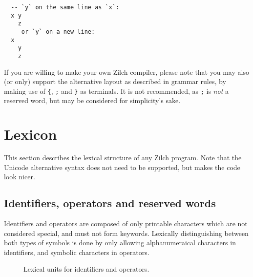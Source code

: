 \noindent\begin{verbatim}
  -- `y` on the same line as `x`:
  x y
    z
  -- or `y` on a new line:
  x
    y
    z
\end{verbatim}
\vspace*{\baselineskip}

If you are willing to make your own Zilch compiler, please note that you may also (or only) support the alternative layout as described in grammar rules, by making use of \verb|{|, \verb|;| and \verb|}| as terminals.
It is not recommended, as \verb|;| is \textit{not} a reserved word, but may be considered for simplicity's sake.

\section{Lexicon}\label{sec:zilch-grammar-lexical}

This section describes the lexical structure of any Zilch program.
Note that the Unicode alternative syntax does not need to be supported, but makes the code look nicer.

\subsection{Identifiers, operators and reserved words}\label{subsec:zilch-grammar-lexical-identifiers}

Identifiers and operators are composed of only printable characters which are not considered special, and must not form keywords.
Lexically distinguishing between both types of symbols is done by only allowing alphanumeraical characters in identifiers, and symbolic characters in operators.

\begin{figure}[H]
  \centering


  \caption{Lexical units for identifiers and operators.}
  \label{fig:zilch-grammar-lexical-identifiers-grammar}
\end{figure}

